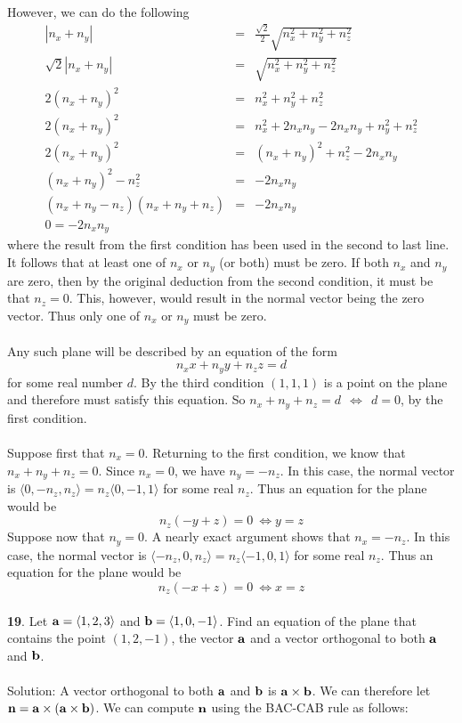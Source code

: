 \documentclass[12pt]{amsbook}
\newcommand{\la}{\langle}
\newcommand{\ra}{\rangle}
\begin{document}
However, we can do the following
\begin{eqnarray*}
|n_x+n_y|&=&\frac{\sqrt{2}}{2}\sqrt{n_x^2+n_y^2+n_z^2}\\
\sqrt{2}|n_x+n_y|&=&\sqrt{n_x^2+n_y^2+n_z^2}\\
2(n_x+n_y)^2&=&n_x^2+n_y^2+n_z^2\\
2(n_x+n_y)^2&=&n_x^2+2n_xn_y-2n_xn_y+n_y^2+n_z^2\\
2(n_x+n_y)^2&=&(n_x+n_y)^2+n_z^2-2n_xn_y\\
(n_x+n_y)^2-n_z^2&=&-2n_xn_y\\
(n_x+n_y-n_z)(n_x+n_y+n_z)&=&-2n_xn_y\\
0=-2n_xn_y
\end{eqnarray*}
where the result from the first condition has been used in the second to last line. It follows that at least one of $n_x$ or $n_y$ (or both) must be zero. If both $n_x$ and $n_y$ are zero, then by the original deduction from the second condition, it must be that $n_z=0$. This, however, would result in the normal vector being the zero vector. Thus only one of $n_x$ or $n_y$ must be zero.
\\
\\
Any such plane will be described by an equation of the form
$$n_xx+n_yy+n_zz=d$$
for some real number $d$. By the third condition $(1,1,1)$ is a point on the plane and therefore must satisfy this equation. So $n_x+n_y+n_z=d \ \ \Leftrightarrow \ \ d=0$, by the first condition.
\\
\\
Suppose first that $n_x=0$. Returning to the first condition, we know that $n_x+n_y+n_z=0$. Since $n_x=0$, we have $n_y=-n_z$. In this case, the normal vector is $\la 0,-n_z,n_z \ra=n_z\la 0,-1,1\ra$ for some real $n_z$. Thus an equation for the plane would be
$$n_z(-y+z)=0 \ \Leftrightarrow y=z$$
Suppose now that $n_y=0$. A nearly exact argument shows that $n_x=-n_z$. In this case, the normal vector is $\la -n_z,0,n_z \ra=n_z\la -1,0,1\ra$ for some real $n_z$. Thus an equation for the plane would be
$$n_z(-x+z)=0 \ \Leftrightarrow x=z$$
\\
{\small\bf 19}. Let ${\bf a}=\la 1,2,3\ra$ and ${\bf b}=
\la 1,0,-1\ra$. Find an equation of the plane 
that 
contains the point $(1,2,-1)$, the vector
${\bf a}$ and a vector orthogonal 
to both ${\bf a}$ and ${\bf b}$.\\
\\
{\sc Solution}: A vector orthogonal to both $\bf a$ and $\bf b$ is ${\bf a}\times{\bf b}$. We can therefore let ${\bf n}={\bf a}\times({\bf a}\times{\bf b})$. We can compute ${\bf n}$ using the BAC-CAB rule as follows:
\end{document}
